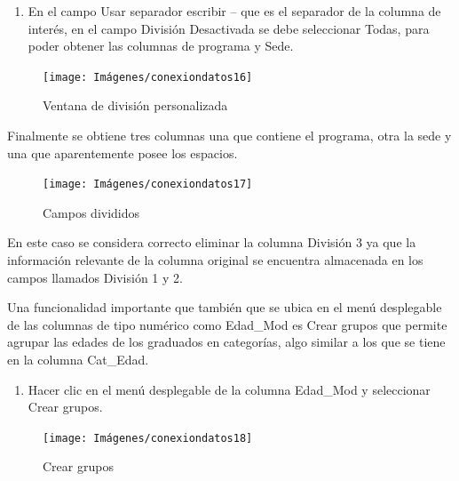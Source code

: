 \documentclass[
]{book}
\providecommand{\tightlist}{%
  \setlength{\itemsep}{0pt}\setlength{\parskip}{0pt}}
\begin{document}
\begin{enumerate}
\def\labelenumi{\arabic{enumi}.}
\setcounter{enumi}{1}
\tightlist
\item
  En el campo Usar separador escribir -- que es el separador de la columna de interés, en el campo División Desactivada se debe seleccionar Todas, para poder obtener las columnas de programa y Sede.
\end{enumerate}

\begin{figure}

{\centering \texttt{[image: Imágenes/conexiondatos16]} 

}

\caption{Ventana de división personalizada}\label{fig:divisiónpersonalizadapasos-fig}
\end{figure}

Finalmente se obtiene tres columnas una que contiene el programa, otra la sede y una que aparentemente posee los espacios.

\begin{figure}

{\centering \texttt{[image: Imágenes/conexiondatos17]} 

}

\caption{Campos divididos}\label{fig:camposdivididospersonalizado-fig}
\end{figure}

En este caso se considera correcto eliminar la columna División 3 ya que la información relevante de la columna original se encuentra almacenada en los campos llamados División 1 y 2.

Una funcionalidad importante que también que se ubica en el menú desplegable de las columnas de tipo numérico como Edad\_Mod es Crear grupos que permite agrupar las edades de los graduados en categorías, algo similar a los que se tiene en la columna Cat\_Edad.

\begin{enumerate}
\def\labelenumi{\arabic{enumi}.}
\tightlist
\item
  Hacer clic en el menú desplegable de la columna Edad\_Mod y seleccionar Crear grupos.
\end{enumerate}

\begin{figure}

{\centering \texttt{[image: Imágenes/conexiondatos18]} 

}

\caption{Crear grupos}\label{fig:creargrupos-fig}
\end{figure}
\end{document}
